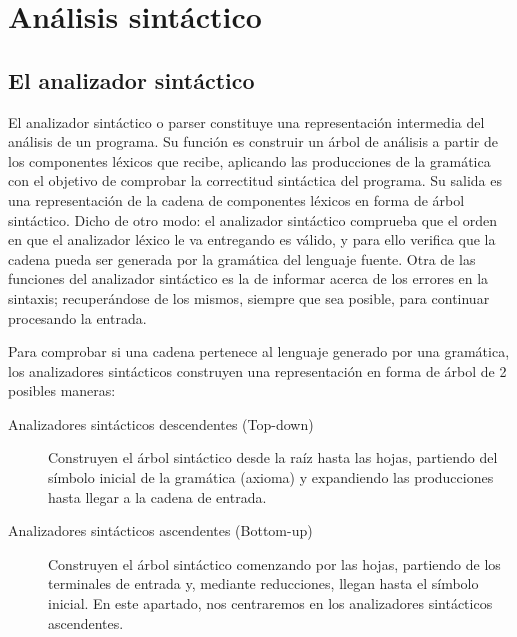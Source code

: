 \documentclass[11pt, english]{article}
\begin{document}
	\newpage
	
	\section{Análisis sintáctico}
	
	\subsection{El analizador sintáctico}
	
	El analizador sintáctico o parser constituye una representación intermedia del análisis de un programa. Su función es construir un árbol de análisis a partir de los componentes léxicos que recibe, aplicando las producciones de la gramática con el objetivo de comprobar la correctitud sintáctica del programa. Su salida es una representación de la cadena de componentes léxicos en forma de árbol sintáctico.
	\newline
	\newline
	Dicho de otro modo: el analizador sintáctico comprueba que el orden en que el analizador léxico le va entregando es válido, y para ello verifica que la cadena pueda ser generada por la gramática del lenguaje fuente.
	\newline
	\newline
	Otra de las funciones del analizador sintáctico es la de informar acerca de los errores en la sintaxis; recuperándose de los mismos, siempre que sea posible, para continuar procesando la entrada.
	
	\newpage
		
	Para comprobar si una cadena pertenece al lenguaje generado por una gramática, los analizadores sintácticos construyen una representación en forma de árbol de 2 posibles maneras:
	\newline
	\begin{description}
		\item[Analizadores sintácticos descendentes (Top-down)] Construyen el árbol sintáctico desde la raíz hasta las hojas, partiendo del símbolo inicial de la gramática (axioma) y expandiendo las producciones  hasta llegar a la cadena de entrada.
		\newline
		\item[Analizadores sintácticos ascendentes (Bottom-up)] Construyen el árbol sintáctico comenzando por las hojas, partiendo de los terminales de entrada y, mediante reducciones, llegan hasta el símbolo inicial. En este apartado, nos centraremos en los  analizadores  sintácticos ascendentes.
	\end{description}
	
\end{document}
